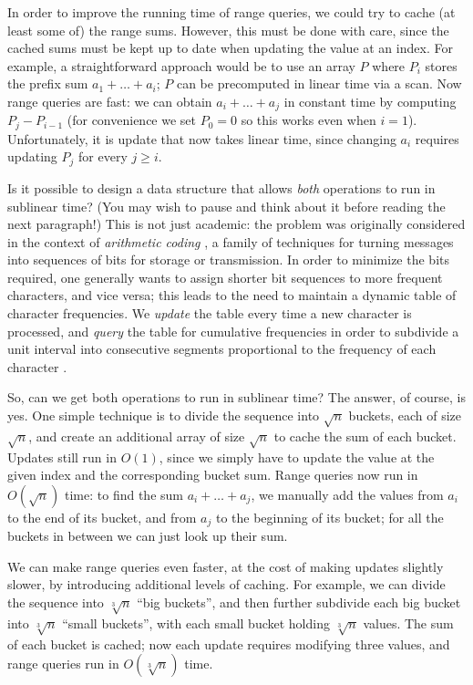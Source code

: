 \documentclass{jfp}
\renewcommand{\geq}{\geqslant}
\theoremstyle{definition}
\theoremstyle{remark}
\begin{document}
In order to improve the running time of range queries, we could try to
cache (at least some of) the range sums.  However, this must be done
with care, since the cached sums must be kept up to date when updating
the value at an index.  For example, a straightforward approach would
be to use an array $P$ where $P_i$ stores the prefix sum
$a_1 + \dots + a_i$; $P$ can be precomputed in linear time via a scan.
Now range queries are fast: we can obtain $a_i + \dots + a_j$ in
constant time by computing $P_j - P_{i-1}$ (for convenience we set
$P_0 = 0$ so this works even when $i=1$).  Unfortunately, it is update
that now takes linear time, since changing $a_i$ requires updating
$P_j$ for every $j \geq i$.

Is it possible to design a data structure that allows \emph{both}
operations to run in sublinear time?  (You may wish to pause and think
about it before reading the next paragraph!)  This is not just
academic: the problem was originally considered in the context of
\emph{arithmetic coding} \citep{rissanen1979arithmetic,
  bird2002arithmetic}, a family of techniques for turning messages
into sequences of bits for storage or transmission.  In order to
minimize the bits required, one generally wants to assign shorter bit
sequences to more frequent characters, and vice versa; this leads to
the need to maintain a dynamic table of character frequencies.  We
\emph{update} the table every time a new character is processed, and
\emph{query} the table for cumulative frequencies in order to
subdivide a unit interval into consecutive segments proportional to
the frequency of each character \citep{fenwick1994new, ryabko1989fast}.

So, can we get both operations to run in sublinear time?  The answer,
of course, is yes.  One simple technique is to divide the sequence
into $\sqrt n$ buckets, each of size $\sqrt n$, and create an
additional array of size $\sqrt n$ to cache the sum of each bucket.
Updates still run in $O(1)$, since we simply have to update the value
at the given index and the corresponding bucket sum.
Range queries now run in $O(\sqrt n)$ time: to find the sum
$a_i + \dots + a_j$, we manually add the values from $a_i$ to the end
of its bucket, and from $a_j$ to the beginning of its bucket; for all
the buckets in between we can just look up their sum.

We can make range queries even faster, at the cost of making updates
slightly slower, by introducing additional levels of caching.  For
example, we can divide the sequence into $\sqrt[3] n$ ``big buckets'',
and then further subdivide each big bucket into $\sqrt[3] n$ ``small
buckets'', with each small bucket holding $\sqrt[3] n$ values.  The
sum of each bucket is cached; now each update requires modifying three
values, and range queries run in $O(\sqrt[3] n)$ time.
\end{document}
